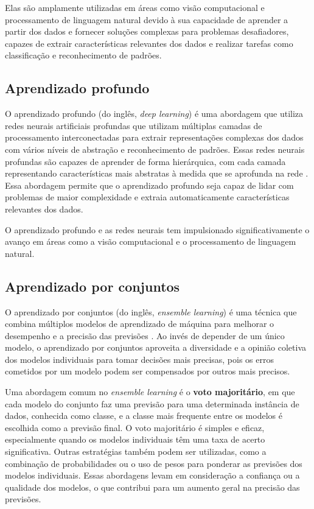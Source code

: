 Elas são amplamente utilizadas em áreas como visão computacional e processamento de linguagem natural devido à sua capacidade de aprender a partir dos dados e fornecer soluções complexas para problemas desafiadores, capazes de extrair características relevantes dos dados e realizar tarefas como classificação e reconhecimento de padrões.

\subsection{Aprendizado profundo}

O aprendizado profundo (do inglês, \textit{deep learning}) é uma abordagem que utiliza redes neurais artificiais profundas que utilizam múltiplas camadas de processamento interconectadas para extrair representações complexas dos dados com vários níveis de abstração e reconhecimento de padrões. Essas redes neurais profundas são capazes de aprender de forma hierárquica, com cada camada representando características mais abstratas à medida que se aprofunda na rede \cite{AurelienGeron2019}. Essa abordagem permite que o aprendizado profundo seja capaz de lidar com problemas de maior complexidade e extraia automaticamente características relevantes dos dados.

O aprendizado profundo e as redes neurais tem impulsionado significativamente o avanço em áreas como a visão computacional e o processamento de linguagem natural.

\subsection{Aprendizado por conjuntos}

O aprendizado por conjuntos (do inglês, \textit{ensemble learning}) é uma técnica que combina múltiplos modelos de aprendizado de máquina para melhorar o desempenho e a precisão das previsões \cite{OPITZEnsemble}. Ao invés de depender de um único modelo, o aprendizado por conjuntos aproveita a diversidade e a opinião coletiva dos modelos individuais para tomar decisões mais precisas, pois os erros cometidos por um modelo podem ser compensados por outros mais precisos. 

Uma abordagem comum no \textit{ensemble learning} é o \textbf{voto majoritário}, em que cada modelo do conjunto faz uma previsão para uma determinada instância de dados, conhecida como classe, e a classe mais frequente entre os modelos é escolhida como a previsão final. O voto majoritário é simples e eficaz, especialmente quando os modelos individuais têm uma taxa de acerto significativa. Outras estratégias também podem ser utilizadas, como a combinação de probabilidades ou o uso de pesos para ponderar as previsões dos modelos individuais. Essas abordagens levam em consideração a confiança ou a qualidade dos modelos, o que contribui para um aumento geral na precisão das previsões.

